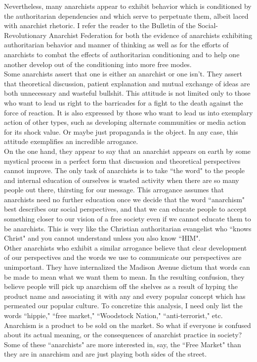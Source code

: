 Nevertheless, many anarchists appear to exhibit behavior which is conditioned by the authoritarian dependencies and which serve to perpetuate them, albeit laced with anarchist rhetoric. I refer the reader to the Bulletin of the Social-Revolutionary Anarchist Federation for both the evidence of anarchists exhibiting authoritarian behavior and manner of thinking as well as for the efforts of anarchists to combat the effects of authoritarian conditioning and to help one another develop out of the conditioning into more free modes.\\
Some anarchists assert that one is either an anarchist or one isn't. They assert that theoretical discussion, patient explanation and mutual exchange of ideas are both unnecessary and wasteful bullshit. This attitude is not limited only to those who want to lead us right to the barricades for a fight to the death against the force of reaction. It is also expressed by those who want to lead us into exemplary action of other types, such as developing alternate communities or media action for its shock value. Or maybe just propaganda is the object. In any case, this attitude exemplifies an incredible arrogance.\\
On the one hand, they appear to say that an anarchist appears on earth by some mystical process in a perfect form that discussion and theoretical perspectives cannot improve. The only task of anarchists is to take ``the word" to the people and internal education of ourselves is wasted activity when there are so many people out there, thirsting for our message. This arrogance assumes that anarchists need no further education once we decide that the word ``anarchism" best describes our social perspectives, and that we can educate people to accept something closer to our vision of a free society even if we cannot educate them to be anarchists. This is very like the Christian authoritarian evangelist who ``knows Christ" and you cannot understand unless you also know ``HIM".\\
Other anarchists who exhibit a similar arrogance believe that clear development of our perspectives and the words we use to communicate our perspectives are unimportant. They have internalized the Madison Avenue dictum that words can be made to mean what we want them to mean. In the resulting confusion, they believe people will pick up anarchism off the shelves as a result of hyping the product name and associating it with any and every popular concept which has permeated our popular culture. To concretize this analysis, I need only list the words ``hippie," ``free market," ``Woodstock Nation," ``anti-terrorist," etc. Anarchism is a product to be sold on the market. So what if everyone is confused about its actual meaning, or the consequences of anarchist practice in society? Some of these ``anarchists" are more interested in, say, the ``Free Market" than they are in anarchism and are just playing both sides of the street.\\
